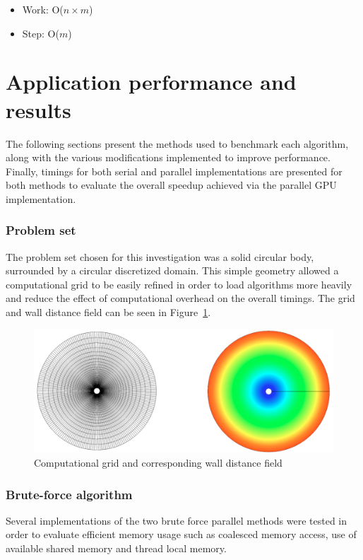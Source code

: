 \documentclass[]{aiaa-tc}%
\begin{document}
\begin{itemize}
\item Work: O($n \times m$)
\item Step: O($m$)
\end{itemize}


\section{Application performance and results}
The following sections present the methods used to benchmark each
algorithm, along with the various modifications implemented to improve
performance. Finally, timings for both serial and parallel
implementations are presented for both methods to evaluate the overall
speedup achieved via the parallel GPU implementation.


\subsubsection{Problem set}
The problem set chosen for this investigation was a solid circular
body, surrounded by a circular discretized domain. This simple
geometry allowed a computational grid to be easily refined in order to
load algorithms more heavily and reduce the effect of computational
overhead on the overall timings. The grid and wall distance field can
be seen in Figure~\ref{f:circle}.

\begin{figure}
  \centering
  \includegraphics[width=0.7\linewidth]{figures/grid/circle_grid}
  \caption{Computational grid and corresponding wall distance field}
  \label{f:circle}
\end{figure}


\subsubsection{Brute-force algorithm}

Several implementations of the two brute force parallel methods were
tested in order to evaluate efficient memory usage such as coalesced
memory access, use of available shared memory and thread local
memory. 
\end{document}
